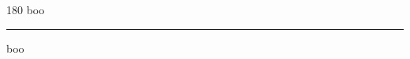
\begin{frame}
\begin{center}
\begin{turn}{180}
{\fontsize{2.5cm}{1em}\selectfont boo}
\end{turn}
\vspace{1em}\par  
\hrule
\vspace{1em}\par  
{\fontsize{2.5cm}{1em}\selectfont boo}
\end{center}
\end{frame}
